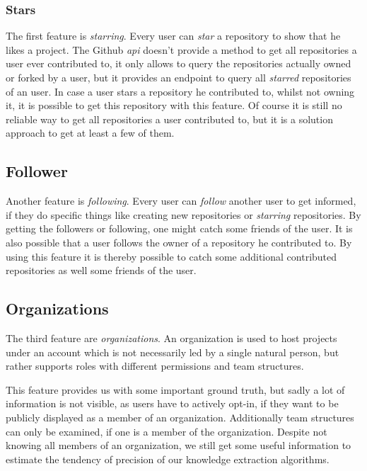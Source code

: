 \subsubsection{Stars}
The first feature is \emph{starring}. Every user can \emph{star} a repository to show that he likes a project.
The Github \emph{api} doesn't provide a method to get all repositories a user ever contributed to, it only allows to query the repositories actually owned or forked by a user, but it provides an endpoint to query all \emph{starred} repositories of an user.
In case a user stars a repository he contributed to, whilst not owning it, it is possible to get this repository with this feature.
Of course it is still no reliable way to get all repositories a user contributed to, but it is a solution approach to get at least a few of them.

\subsection{Follower}
Another feature is \emph{following}. Every user can \emph{follow} another user to get informed, if they do specific things like creating new repositories or \emph{starring} repositories.
By getting the followers or following, one might catch some friends of the user.
It is also possible that a user follows the owner of a repository he contributed to.
By using this feature it is thereby possible to catch some additional contributed repositories as well some friends of the user.

\subsection{Organizations}\label{github-organization}
The third feature are \emph{organizations}.
An organization is used to host projects under an account which is not necessarily led by a single natural person, but rather supports roles with different permissions and team structures.

This feature provides us with some important ground truth, but sadly a lot of information is not visible, as users have to actively opt-in, if they want to be publicly displayed as a member of an organization.
Additionally team structures can only be examined, if one is a member of the organization.
Despite not knowing all members of an organization, we still get some useful information to estimate the tendency of precision of our knowledge extraction algorithms.
